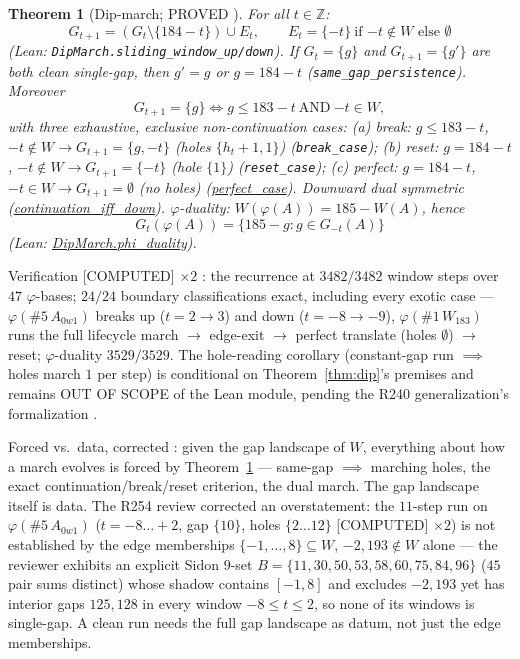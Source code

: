 \documentclass[11pt,a4paper]{article}
\newtheorem{theorem}{Theorem}
\theoremstyle{definition}
\begin{document}
\begin{theorem}[Dip-march; PROVED \cite{D262}]
  \label{thm:dipmarch}
  For all $t\in\mathbb{Z}$:
  \begin{equation}
    \label{eq:slide}
    G_{t+1}=(G_t\setminus\{184-t\})\cup E_t,\qquad
    E_t=\{-t\}\ \text{if }{-t}\notin W\text{ else }\emptyset
  \end{equation}
  (Lean: \texttt{DipMarch.sliding\_window\_up/down}).
  If $G_t=\{g\}$ and $G_{t+1}=\{g'\}$ are both clean single-gap, then
  $g'=g$ or $g=184-t$ (\texttt{same\_gap\_persistence}). Moreover
  \begin{equation}
    \label{eq:cont}
    G_{t+1}=\{g\}\iff g\le183-t\ \text{AND}\ {-t}\in W,
  \end{equation}
  with three exhaustive, exclusive non-continuation cases:
  (a) \emph{break:} $g\le183-t$, $-t\notin W\to G_{t+1}=\{g,-t\}$
  (holes $\{h_t+1,1\}$) (\texttt{break\_case});
  (b) \emph{reset:} $g=184-t$, $-t\notin W\to G_{t+1}=\{-t\}$
  (hole $\{1\}$) (\texttt{reset\_case});
  (c) \emph{perfect:} $g=184-t$, $-t\in W\to G_{t+1}=\emptyset$
  (no holes) (\url{perfect_case}).
  Downward dual symmetric (\url{continuation_iff_down}).
  $\varphi$-duality: $W(\varphi(A))=185-W(A)$, hence
  \begin{equation}
    \label{eq:dual}
    G_t(\varphi(A))=\{185-g:g\in G_{-t}(A)\}
  \end{equation}
  (Lean: \url{DipMarch.phi_duality}).
\end{theorem}

Verification [COMPUTED] $\times2$ \cite{D247}: the recurrence at
$3482/3482$ window steps over $47$ $\varphi$-bases; $24/24$ boundary
classifications exact, including every exotic case ---
$\varphi(\#5\,A_{0w1})$ breaks up ($t=2\to3$) and down ($t=-8\to-9$),
$\varphi(\#1\,W_{183})$ runs the full lifecycle
march $\to$ edge-exit $\to$ perfect translate (holes $\emptyset$)
$\to$ reset; $\varphi$-duality $3529/3529$. The hole-reading corollary
(constant-gap run $\implies$ holes march $1$ per step) is conditional
on Theorem~\ref{thm:dip}'s premises and remains OUT OF SCOPE of the
Lean module, pending the R240 generalization's formalization
\cite{D258,D262}.

Forced vs.\ data, corrected \cite{D262}: given the gap landscape of
$W$, everything about how a march evolves is forced by
Theorem~\ref{thm:dipmarch} --- same-gap $\implies$ marching holes,
the exact continuation/break/reset criterion, the dual march. The gap
landscape itself is data. The R254 review corrected an overstatement:
the $11$-step run on $\varphi(\#5\,A_{0w1})$ ($t=-8\ldots+2$, gap
$\{10\}$, holes $\{2\ldots12\}$ [COMPUTED] $\times2$) is not established
by the edge memberships $\{-1,\dots,8\}\subseteq W$, $-2,193\notin W$
alone --- the reviewer exhibits an explicit Sidon $9$-set
$B=\{11,30,50,53,58,60,75,84,96\}$ ($45$ pair sums distinct) whose
shadow contains $[-1,8]$ and excludes $-2,193$ yet has interior gaps
$125,128$ in every window $-8\le t\le2$, so none of its windows is
single-gap. A clean run needs the full gap landscape as datum, not
just the edge memberships.
\end{document}
